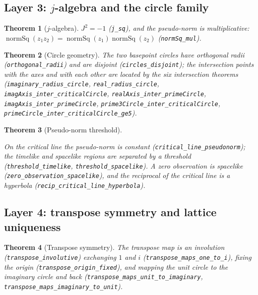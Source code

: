 \documentclass{article}
\newtheorem{theorem}{Theorem}[section]
\begin{document}
\subsection{Layer 3: $j$-algebra and the circle family}
\label{sec:L3a}

\begin{theorem}[$j$-algebra]
\label{thm:jalg}
$J^2=-1$ (\texttt{j\_sq}), and the pseudo-norm is multiplicative:
$\operatorname{normSq}(z_1z_2)=\operatorname{normSq}(z_1)\operatorname{normSq}(z_2)$
(\texttt{normSq\_mul}).
\end{theorem}

\begin{theorem}[Circle geometry]
\label{thm:circles}
The two basepoint circles have orthogonal radii
(\texttt{orthogonal\_radii}) and are disjoint (\texttt{circles\_disjoint});
the intersection points with the axes and with each other are located by the
six intersection theorems (\texttt{imaginary\_radius\_circle},
\texttt{real\_radius\_circle}, \texttt{imagAxis\_inter\_criticalCircle},
\texttt{realAxis\_inter\_primeCircle},
\texttt{imagAxis\_inter\_primeCircle},
\texttt{prime3Circle\_inter\_criticalCircle},
\texttt{primeCircle\_inter\_criticalCircle\_ge5}).
\end{theorem}

\begin{theorem}[Pseudo-norm threshold]
\label{thm:threshold}
\begin{sloppypar}On the critical line the pseudo-norm is constant
(\texttt{critical\_line\_pseudonorm}); the timelike and spacelike regions
are separated by a threshold
(\texttt{threshold\_timelike}, \texttt{threshold\_spacelike}). A zero
observation is spacelike (\texttt{zero\_observation\_spacelike}), and the
reciprocal of the critical line is a hyperbola
(\texttt{recip\_critical\_line\_hyperbola}).\end{sloppypar}
\end{theorem}

\subsection{Layer 4: transpose symmetry and lattice uniqueness}
\label{sec:L4}

\begin{theorem}[Transpose symmetry]
\label{thm:transpose}
The transpose map is an involution (\texttt{transpose\_involutive})
exchanging $1$ and $i$ (\texttt{transpose\_maps\_one\_to\_i}), fixing the
origin (\texttt{transpose\_origin\_fixed}), and mapping the unit circle to
the imaginary circle and back
(\texttt{transpose\_maps\_unit\_to\_imaginary},
\texttt{transpose\_maps\_imaginary\_to\_unit}).
\end{theorem}
\end{document}
